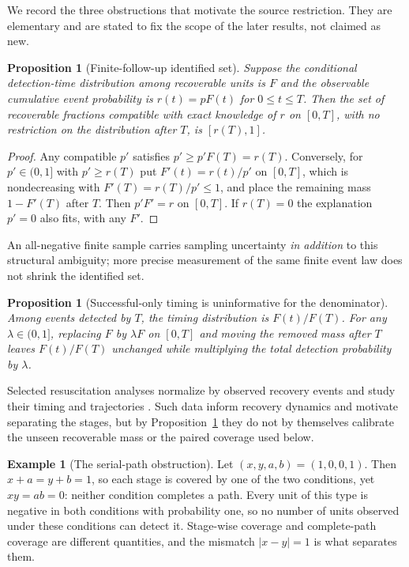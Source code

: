 \documentclass[11pt]{article}
\newtheorem{proposition}[theorem]{Proposition}
\theoremstyle{definition}
\newtheorem{example}[theorem]{Example}
\theoremstyle{remark}
\begin{document}
We record the three obstructions that motivate the source restriction. They are
elementary and are stated to fix the scope of the later results, not claimed as
new.

\begin{proposition}[Finite-follow-up identified set]\label{prop:ident}
Suppose the conditional detection-time distribution among recoverable units is
$F$ and the observable cumulative event probability is $r(t)=pF(t)$ for
$0\le t\le T$. Then the set of recoverable fractions compatible with exact
knowledge of $r$ on $[0,T]$, with no restriction on the distribution after $T$,
is $[r(T),1]$.
\end{proposition}

\begin{proof}
Any compatible $p'$ satisfies $p'\ge p'F(T)=r(T)$. Conversely, for $p'\in(0,1]$
with $p'\ge r(T)$ put $F'(t)=r(t)/p'$ on $[0,T]$, which is nondecreasing with
$F'(T)=r(T)/p'\le1$, and place the remaining mass $1-F'(T)$ after $T$. Then
$p'F'=r$ on $[0,T]$. If $r(T)=0$ the explanation $p'=0$ also fits, with any $F'$.
\end{proof}

An all-negative finite sample carries sampling uncertainty \emph{in addition} to
this structural ambiguity; more precise measurement of the same finite event law
does not shrink the identified set.

\begin{proposition}[Successful-only timing is uninformative for the
denominator]\label{prop:timing}
Among events detected by $T$, the timing distribution is $F(t)/F(T)$. For any
$\lambda\in(0,1]$, replacing $F$ by $\lambda F$ on $[0,T]$ and moving the removed
mass after $T$ leaves $F(t)/F(T)$ unchanged while multiplying the total detection
probability by $\lambda$.
\end{proposition}

Selected resuscitation analyses normalize by observed recovery events and study
their timing and trajectories \citep{fang2023}. Such data inform recovery
dynamics and motivate separating the stages, but by Proposition~\ref{prop:timing}
they do not by themselves calibrate the unseen recoverable mass or the paired
coverage used below.

\begin{example}[The serial-path obstruction]\label{ex:obstruction}
Let $(x,y,a,b)=(1,0,0,1)$. Then $x+a=y+b=1$, so each stage is covered by one of
the two conditions, yet $xy=ab=0$: neither condition completes a path. Every unit
of this type is negative in both conditions with probability one, so no number of
units observed under these conditions can detect it. Stage-wise coverage and
complete-path coverage are different quantities, and the mismatch $|x-y|=1$ is
what separates them.
\end{example}
\end{document}
